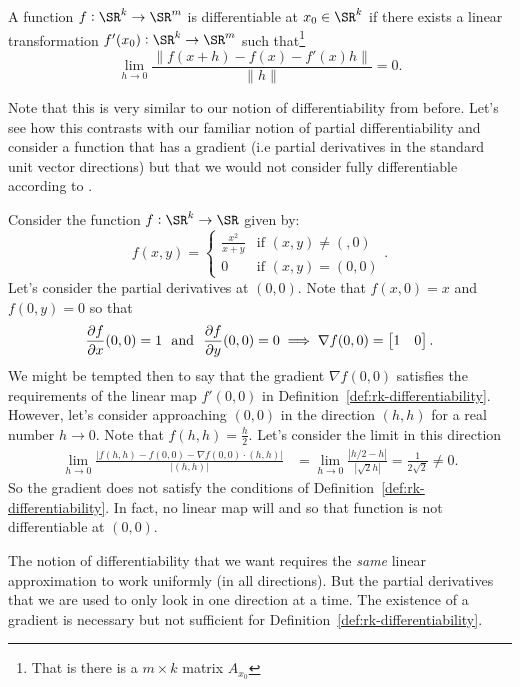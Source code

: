 \begin{definition}[Differentiabiltiy in \(\SR^k\)]
	\label{def:rk-differentiability}
	A function \(f:\SR^k\to\SR^m\) is differentiable at \(x_0\in\SR^k\) if there exists a linear transformation \(f'(x_0):\SR^k\to\SR^m\) such that\footnote{That is there is a \(m\times k\) matrix  \(A_{x_0}\)} 
	\begin{equation}
		\label{eq:rk-differntiability}
		\lim_{h\to 0}\frac{\|f(x+h)-f(x)-f'(x)h\|}{\|h\|}=0 
	.\end{equation} 
\end{definition}
Note that this is very similar to our notion of differentiability from before. Let's see how this contrasts with our familiar notion of partial differentiability and consider a function that has a gradient (i.e partial derivatives in the standard unit vector directions) but that we would not consider fully differentiable according to .
\begin{example*}
	Consider the function \(f:\SR^k \to \SR\) given by:
	\[
		f(x,y) = 
		\begin{cases}
			\frac{x^2}{x+y}  & \text{if }(x,y)\neq (,0) \\
			0 &\text{if }(x,y) = (0,0)
		\end{cases}	
	.\]
	Let's consider the partial derivatives at \((0,0)\). Note that \(f(x,0) = x\) and  \(f(0,y) = 0\) so that
	\[
		\frac{\partial f}{\partial x}(0,0) = 1 \hbox{ }\text{ and }\hbox{ } \frac{\partial f}{\partial y}(0,0) = 0 \implies \nabla f(0,0) = \begin{bmatrix} 1 & 0 \end{bmatrix} 
	.\] 
	We might be tempted then to say that the gradient \(\nabla f(0,0)\) satisfies the requirements of the linear map  \(f'(0,0)\) in Definition~\ref{def:rk-differentiability}. However, let's consider approaching \((0,0)\) in the direction  \((h,h)\) for a real number \(h\to 0\). Note that \(f(h,h) = \frac{h}{2}\). Let's consider the limit in this direction
	\begin{align*}
		\lim_{h\to 0}\frac{|f(h,h) - f(0,0) - \nabla f(0,0)\cdot(h,h)|}{|(h,h)|} &= \lim_{h\to 0}\frac{|h/2 - h|}{|\sqrt{2}h|} = \frac{1}{2\sqrt{2}}\neq 0  
	.\end{align*} 
	So the gradient does not satisfy the conditions of Definition~\ref{def:rk-differentiability}. In fact, no linear map will and so that function is not differentiable at \((0,0)\).
\end{example*}
\begin{remark*}
	The notion of differentiability that we want requires the \textit{same} linear approximation to work uniformly (in all directions). But the partial derivatives that we are used to only look in one direction at a time. The existence of a gradient is necessary but not sufficient for Definition~\ref{def:rk-differentiability}.	
\end{remark*}


